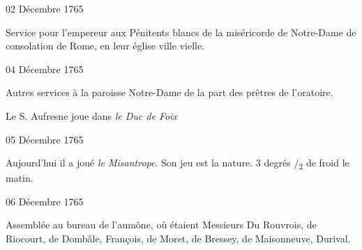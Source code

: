                      \begin{diary}{02 Décembre 1765}{}
                        
                         Service pour l'empereur aux Pénitents blancs
                           de la miséricorde de Notre-Dame de consolation de Rome,
                           en leur église ville
                              vielle. \bigskip
        
        
                     \end{diary}

                     \begin{diary}{04 Décembre 1765}{}
                        
                         Autres services à la paroisse Notre-Dame de la part
                           des prêtres de l'oratoire. \bigskip
        
        
                        
                           Le S. Aufresne joue dans \emph{le Duc de Foix}
                        \bigskip
        
        
                     \end{diary}

                     \begin{diary}{05 Décembre 1765}{}
                        
                         Aujourd'hui il a joué \emph{le Misantrope}. Son
                           jeu est la nature. 3 degrés
                              /\textsubscript{2} de froid le
                              matin. \bigskip
        
        
                     \end{diary}

                     \begin{diary}{06 Décembre 1765}{}
                        
                         Assemblée au bureau de l'aumône, où
                           étaient Messieurs
                           Du Rouvrois, de Riocourt, de
                              Dombâle, François, de Moret,
                              de Bressey,
                           de Maisonneuve, Durival. \bigskip
        
        
                     \end{diary}

